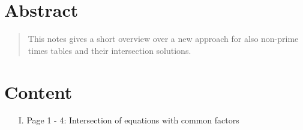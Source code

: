\newpage
\section*{Abstract}
\label{s:abstract}
\begin{abstract}
	This notes gives a short overview over a new approach for also non-prime times tables and their intersection solutions.
\end{abstract}
\section*{Content}
\label{s:content}
\begin{enumerate}
	\item [I.] Page 1 - 4: Intersection of equations with common factors
\end{enumerate}

